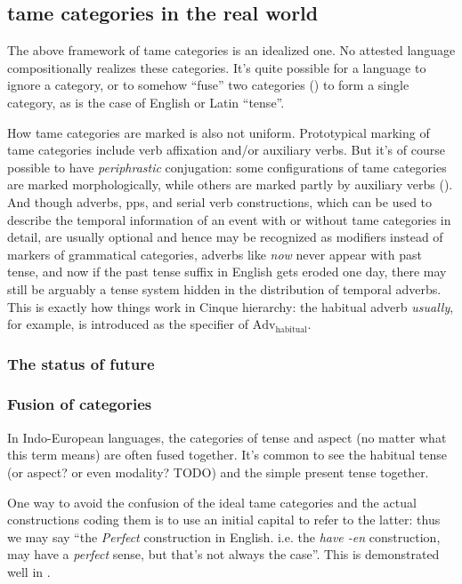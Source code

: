 \documentclass[UTF8, a4paper, oneside, scheme=plain]{ctexart}
\newcommand*{\citepage}[1]{pp.~{#1}}
\newcommand*{\term}[1]{\emph{#1}}
\newcommand*{\corpus}[1]{\emph{#1}}
\begin{document}
\subsection{\ac{tame} categories in the real world}

The above framework of \ac{tame} categories is an idealized one.
No attested language compositionally realizes these categories.
It's quite possible for a language to ignore a category,
or to somehow ``fuse'' two categories ()
to form a single category,
as is the case of English or Latin ``tense''.

How \ac{tame} categories are marked is also not uniform.
Prototypical marking of \ac{tame} categories include 
verb affixation and/or auxiliary verbs.
But it's of course possible to have \emph{periphrastic} conjugation:
some configurations of \ac{tame} categories are marked morphologically,
while others are marked partly by auxiliary verbs ().
And though adverbs, \acs{pp}s, and serial verb constructions,
which can be used to describe the temporal information of an event 
with or without \ac{tame} categories in detail,
are usually optional 
and hence may be recognized as modifiers instead of markers of grammatical categories,
adverbs like \corpus{now} never appear with past tense,
and now if the past tense suffix in English gets eroded one day,
there may still be arguably a tense system
hidden in the distribution of temporal adverbs.
This is exactly how things work in Cinque hierarchy:
the habitual adverb \corpus{usually}, for example,
is introduced as the specifier of $\text{Adv}_{\text{habitual}}$.

\subsubsection{The status of future}

\subsubsection{Fusion of categories}\label{sec:fusion-of-tame}

In Indo-European languages, the categories of tense and aspect (no matter what this term means)
are often fused together.
It's common to see the habitual tense (or aspect? or even modality? TODO) 
and the simple present tense together.

One way to avoid the confusion of the ideal \ac{tame} categories 
and the actual constructions coding them 
is to use an initial capital to refer to the latter:
thus we may say ``the \term{Perfect} construction in English. i.e. the \corpus{have -en} construction,
may have a \term{perfect} sense, but that's not always the case''.
This is demonstrated well in \citet[\citepage{1091}]{jacques2021grammar}.
\end{document}
